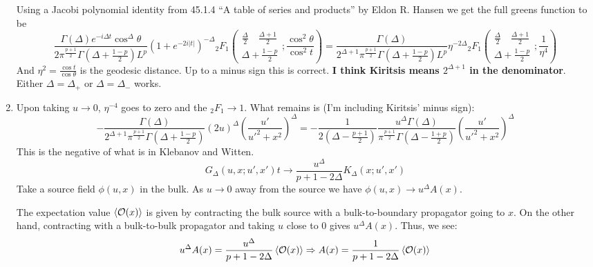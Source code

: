 \documentclass[11pt, class=article, crop=false]{standalone}
\begin{document}
\begin{enumerate}
\[	\]
	Using a Jacobi polynomial identity from 45.1.4 ``A table of series and products'' by Eldon R. Hansen we get the full greens function to be 
	\[
		\frac{\Gamma(\Delta) e^{-i \Delta t} \cos^\Delta \theta}{2 \pi^{\frac{p+1}{2}} \Gamma(\Delta + \frac{1-p}{2}) L^p} (1 + e^{-2 i |t|})^{-\Delta} {_2F_1}\left(\begin{matrix}
			\frac{\Delta}{2} \quad \frac{\Delta + 1}{2}\\ \Delta + \frac{1-p}{2}
		\end{matrix}; \frac{\cos^2 \theta}{\cos^2 t}\right) = \frac{\Gamma(\Delta)}{2^{\Delta + 1} \pi^{\frac{p+1}{2}} \Gamma(\Delta + \frac{1-p}{2}) L^p } \eta^{-2 \Delta} {_2F_1}\left(\begin{matrix}
			\frac{\Delta}{2} \quad \frac{\Delta + 1}{2}\\ \Delta + \frac{1-p}{2}
		\end{matrix}; \frac{1}{\eta^4}\right) 
	\]
	And $\eta^2 = \frac{\cos t}{\cos \theta}$ is the geodesic distance. Up to a minus sign this is correct. \textbf{I think Kiritsis means $2^{\Delta+1}$ in the denominator}. Either $\Delta = \Delta_+$ or $\Delta=\Delta_-$ works. 
	
	
	\item Upon taking $u \to 0$, $\eta^{-4}$ goes to zero and the ${_2F_1} \to 1$. What remains is (I'm including Kiritsis' minus sign):
	\[
		-\frac{\Gamma(\Delta)}{2^{\Delta+1} \pi^{\frac{p+1}{2}} \Gamma(\Delta + \frac{1-p}{2})} (2u)^{\Delta} \left(\frac{u'}{{u'}^2 + x^2} \right)^\Delta = -\frac{1}{2 (\Delta - \frac{p + 1}{2})} \frac{u^\Delta \Gamma(\Delta)}{ \pi^{\frac{p+1}{2}} \Gamma(\Delta - \frac{1+p}{2})} \left(\frac{u'}{{u'}^2 + x^2} \right)^\Delta 
	\]
	This is the negative of what is in Klebanov and Witten. 
	\[
		G_{\Delta}(u, x; u', x') t\to \frac{u^\Delta}{p+1 - 2 \Delta} K_\Delta(x; u', x')
	\]
	Take a source field $\phi(u,x)$ in the bulk. As $u \to 0$ away from the source we have $\phi(u, x) \to u^{\Delta} A(x)$.
	
	The expectation value $\braket{\mathcal{O}(x)}$ is given by contracting the bulk source with a bulk-to-boundary propagator going to $x$. On the other hand, contracting with a bulk-to-bulk propagator and taking $u$ close to $0$ gives $u^{\Delta} A(x)$. Thus, we see:
	\[
		u^{\Delta} A(x) = \frac{u^{\Delta}}{p+1-2\Delta} \braket{\mathcal{O}(x)} \Rightarrow A(x) = \frac{1}{p+1-2 \Delta} \braket{\mathcal{O}(x)}
	\]
	

\end{enumerate}
\end{document}
